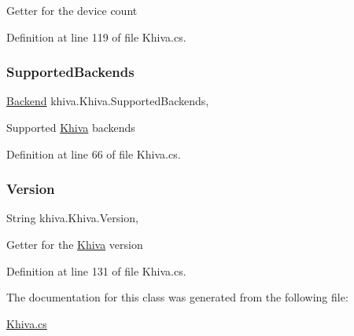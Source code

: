 Getter for the device count 



Definition at line 119 of file Khiva.\+cs.

\mbox{\label{classkhiva_1_1_khiva_ab4b9691c46e4db5099d7e182a3062a0f}} 
\subsubsection{\texorpdfstring{Supported\+Backends}{SupportedBackends}}
{\footnotesize\ttfamily \mbox{\hyperlink{classkhiva_1_1_khiva_a149c512eefcef84e8e94eca721d8cd8f}{Backend}} khiva.\+Khiva.\+Supported\+Backends\hspace{0.3cm}{\ttfamily [static]}, {\ttfamily [get]}}



Supported \mbox{\hyperlink{classkhiva_1_1_khiva}{Khiva}} backends 



Definition at line 66 of file Khiva.\+cs.

\mbox{\label{classkhiva_1_1_khiva_ab4f011c19a19bdf3b1e4ff8c21df359b}} 
\subsubsection{\texorpdfstring{Version}{Version}}
{\footnotesize\ttfamily String khiva.\+Khiva.\+Version\hspace{0.3cm}{\ttfamily [static]}, {\ttfamily [get]}}



Getter for the \mbox{\hyperlink{classkhiva_1_1_khiva}{Khiva}} version 



Definition at line 131 of file Khiva.\+cs.



The documentation for this class was generated from the following file\+:\begin{DoxyCompactItemize}
\item 
\mbox{\hyperlink{_khiva_8cs}{Khiva.\+cs}}\end{DoxyCompactItemize}
